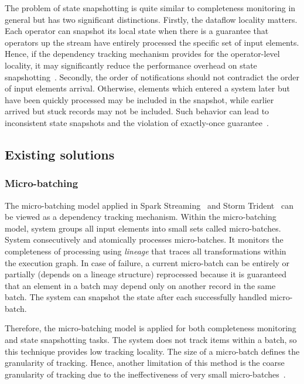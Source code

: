 The problem of state snapshotting is quite similar to completeness monitoring in general but has two significant distinctions. Firstly, the dataflow locality matters. Each operator can snapshot its local state when there is a guarantee that operators up the stream have entirely processed the specific set of input elements. Hence, if the dependency tracking mechanism provides for the operator-level locality, it may significantly reduce the performance overhead on state snapshotting~\cite{Carbone:2017:SMA:3137765.3137777}. Secondly, the order of notifications should not contradict the order of input elements arrival. Otherwise, elements which entered a system later but have been quickly processed may be included in the snapshot, while earlier arrived but stuck records may not be included. Such behavior can lead to inconsistent state snapshots and the violation of exactly-once guarantee~\cite{2015arXiv150608603C}. 

\subsection{Existing solutions} \label{existing_solutions}

\subsubsection{Micro-batching}

The micro-batching model applied in Spark Streaming~\cite{Zaharia:2012:DSE:2342763.2342773} and Storm Trident~\cite{apache:storm:trident} can be viewed as a dependency tracking mechanism. Within the micro-batching model, system groups all input elements into small sets called micro-batches. System consecutively and atomically processes micro-batches. It monitors the completeness of processing using {\em lineage} that traces all transformations within the execution graph. In case of failure, a current micro-batch can be entirely or partially (depends on a lineage structure) reprocessed because it is guaranteed that an element in a batch may depend only on another record in the same batch. The system can snapshot the state after each successfully handled micro-batch. 

Therefore, the micro-batching model is applied for both completeness monitoring and state snapshotting tasks. The system does not track items within a batch, so this technique provides low tracking locality. The size of a micro-batch defines the granularity of tracking. Hence, another limitation of this method is the coarse granularity of tracking due to the ineffectiveness of very small micro-batches~\cite{Zaharia:2012:DSE:2342763.2342773}.


